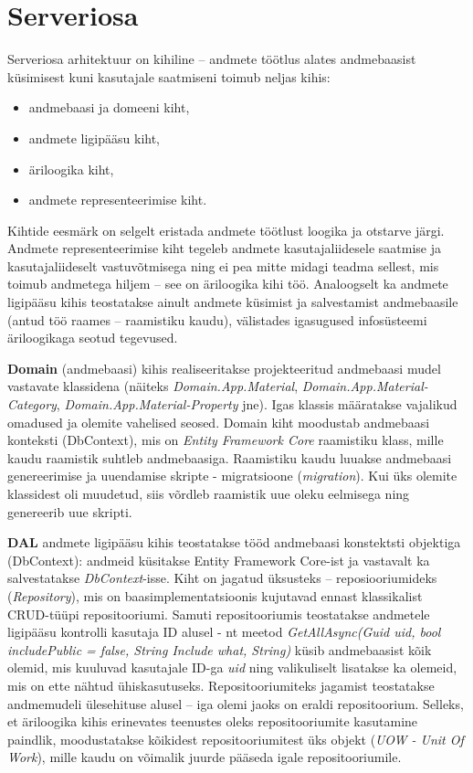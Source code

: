 \section{Serveriosa}
Serveriosa arhitektuur on kihiline -- andmete töötlus alates andmebaasist küsimisest kuni kasutajale saatmiseni toimub neljas kihis:
\begin{itemize}
    \item andmebaasi ja domeeni kiht,
    \item andmete ligipääsu kiht,
    \item äriloogika kiht,
    \item andmete representeerimise kiht.
\end{itemize}
Kihtide eesmärk on selgelt eristada andmete töötlust loogika ja otstarve järgi. Andmete representeerimise kiht tegeleb andmete 
kasutajaliidesele saatmise ja kasutajaliideselt vastuvõtmisega ning ei pea mitte midagi teadma sellest, mis toimub andmetega hiljem --
see on äriloogika kihi töö. Analoogselt ka andmete ligipääsu kihis teostatakse ainult andmete küsimist ja salvestamist andmebaasile
(antud töö raames -- raamistiku kaudu), välistades igasugused infosüsteemi äriloogikaga seotud tegevused.
 

\textbf{Domain} (andmebaasi) kihis realiseeritakse projekteeritud andmebaasi mudel vastavate klassidena (näiteks \textit{Domain.App.Material},
\textit{Domain.App.Material-Category}, \textit{Domain.App.Material-Property} jne). Igas klassis määratakse vajalikud omadused ja
olemite vahelised seosed. Domain kiht moodustab andmebaasi konteksti (DbContext), mis on \textit{Entity Framework Core} raamistiku klass,
mille kaudu raamistik suhtleb andmebaasiga. Raamistiku kaudu luuakse andmebaasi genereerimise ja uuendamise skripte - migratsioone
(\textit{migration}). Kui üks olemite klassidest oli muudetud, siis võrdleb raamistik uue oleku eelmisega ning genereerib uue skripti.


\textbf{DAL} andmete ligipääsu kihis teostatakse tööd andmebaasi konstektsti objektiga (DbContext):  andmeid küsitakse Entity Framework Core-ist ja 
vastavalt ka salvestatakse \textit{DbContext}-isse. Kiht on jagatud üksusteks -- reposiooriumideks (\textit{Repository}), mis on 
baasimplementatsioonis kujutavad ennast klassikalist CRUD-tüüpi repositooriumi. Samuti repositooriumis 
teostatakse andmetele ligipääsu kontrolli kasutaja ID alusel -
nt meetod \textit{GetAllAsync(Guid uid, bool includePublic = false, String Include what, String)} küsib andmebaasist kõik olemid, 
mis kuuluvad kasutajale ID-ga \textit{uid} ning valikuliselt lisatakse ka olemeid, mis on ette nähtud ühiskasutuseks. 
Repositooriumiteks jagamist teostatakse andmemudeli ülesehituse alusel -- iga olemi jaoks on eraldi repositoorium. Selleks, et
äriloogika kihis erinevates teenustes oleks repositooriumite kasutamine paindlik, moodustatakse kõikidest repositooriumitest üks
objekt (\textit{UOW - Unit Of Work}), mille kaudu on võimalik juurde pääseda igale repositooriumile.

